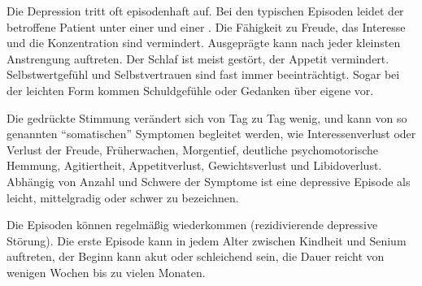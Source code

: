 Die Depression tritt oft episodenhaft auf. Bei den typischen
Episoden leidet der betroffene Patient unter einer
 und einer . Die Fähigkeit zu Freude, das
Interesse und die Konzentration sind vermindert. Ausgeprägte
 kann nach jeder kleinsten Anstrengung
auftreten. Der Schlaf ist meist gestört, der Appetit
vermindert. Selbstwertgefühl und Selbstvertrauen sind fast
immer beeinträchtigt. Sogar bei der leichten Form kommen
Schuldgefühle oder Gedanken über eigene 
vor.

Die gedrückte Stimmung verändert sich von Tag zu Tag wenig,
 und kann von so
genannten \enquote{somatischen} Symptomen begleitet werden, wie
Interessenverlust oder Verlust der Freude, Früherwachen,
Morgentief, deutliche psychomotorische Hemmung,
Agitiertheit, Appetitverlust, Gewichtsverlust und
Libidoverlust. Abhängig von Anzahl und Schwere der Symptome
ist eine depressive Episode als leicht, mittelgradig oder
schwer zu bezeichnen. \cite{ICD10De}

Die Episoden können regelmäßig wiederkommen (rezidivierende
depressive Störung). Die erste Episode kann in jedem Alter
zwischen Kindheit und Senium auftreten, der Beginn kann akut
oder schleichend sein, die Dauer reicht von wenigen Wochen
bis zu vielen Monaten.
\cite{ICD10De}



 

% 
% 
% 
% 
% 
% 
% 
% 
% 
% 
% 
% 
% 
% 
% 
% 
% 
% 
% 
% 
% 
% 
% 
% 
% 
% 



